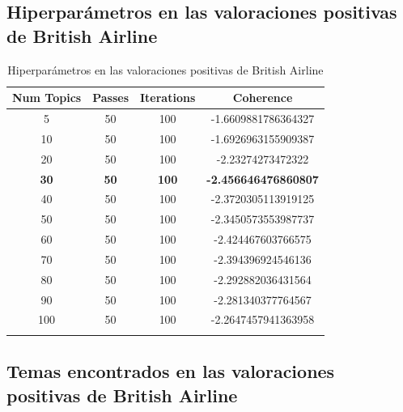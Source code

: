 \documentclass{report}
\begin{document}
{{            \subsection{Hiperparámetros en las valoraciones positivas de British Airline}
                \label{tab:hiperparametros_british_airline_positivas}
                \begin{longtable}{|c|c|c|c|}
                    \hline
                    \textbf{Num Topics} & \textbf{Passes} & \textbf{Iterations} & \textbf{Coherence} \\
                    \hline
                    5 & 50 & 100 & -1.6609881786364327 \\
                    \hline
                    10 & 50 & 100 & -1.6926963155909387 \\
                    \hline
                    20 & 50 & 100 & -2.23274273472322 \\
                    \hline
                    \textbf{30} & \textbf{50} & \textbf{100} & \textbf{-2.456646476860807} \\
                    \hline
                    40 & 50 & 100 & -2.3720305113919125 \\
                    \hline
                    50 & 50 & 100 & -2.3450573553987737 \\
                    \hline
                    60 & 50 & 100 & -2.424467603766575 \\
                    \hline
                    70 & 50 & 100 & -2.394396924546136 \\
                    \hline
                    80 & 50 & 100 & -2.292882036431564 \\
                    \hline
                    90 & 50 & 100 & -2.281340377764567 \\
                    \hline
                    100 & 50 & 100 & -2.2647457941363958 \\
                    \hline
                    \caption{Hiperparámetros en las valoraciones positivas de British Airline}
                \end{longtable}
            \clearpage\subsection{Temas encontrados en las valoraciones positivas de British Airline}
                \label{tab:temas_british_airline_positivas}
                \begin{longtable}{|p{1cm}|p{4cm}|p{4cm}|p{6cm}|}

\end{longtable}}}
\end{document}
